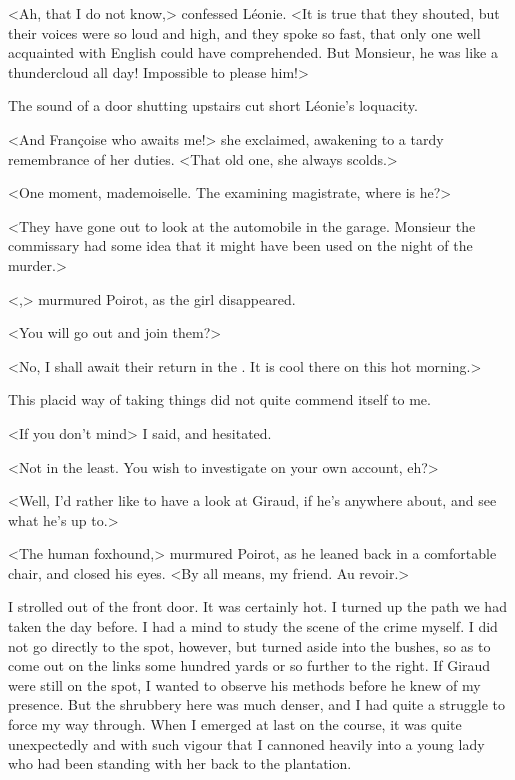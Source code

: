  <Ah, that I do not know,> confessed Léonie. <It is true that they shouted, but their voices were so loud and high, and they spoke so fast, that only one well acquainted with English could have comprehended. But Monsieur, he was like a thundercloud all day! Impossible to please him!> 

 The sound of a door shutting upstairs cut short Léonie's loquacity. 

 <And Françoise who awaits me!> she exclaimed, awakening to a tardy remembrance of her duties. <That old one, she always scolds.> 

 <One moment, mademoiselle. The examining magistrate, where is he?> 

 <They have gone out to look at the automobile in the garage. Monsieur the commissary had some idea that it might have been used on the night of the murder.> 

 <,> murmured Poirot, as the girl disappeared. 

 <You will go out and join them?> 

 <No, I shall await their return in the . It is cool there on this hot morning.> 

 This placid way of taking things did not quite commend itself to me. 

 <If you don't mind\longdash> I said, and hesitated. 

 <Not in the least. You wish to investigate on your own account, eh?> 

 <Well, I'd rather like to have a look at Giraud, if he's anywhere about, and see what he's up to.> 

 <The human foxhound,> murmured Poirot, as he leaned back in a comfortable chair, and closed his eyes. <By all means, my friend. Au revoir.> 

 I strolled out of the front door. It was certainly hot. I turned up the path we had taken the day before. I had a mind to study the scene of the crime myself. I did not go directly to the spot, however, but turned aside into the bushes, so as to come out on the links some hundred yards or so further to the right. If Giraud were still on the spot, I wanted to observe his methods before he knew of my presence. But the shrubbery here was much denser, and I had quite a struggle to force my way through. When I emerged at last on the course, it was quite unexpectedly and with such vigour that I cannoned heavily into a young lady who had been standing with her back to the plantation. 

